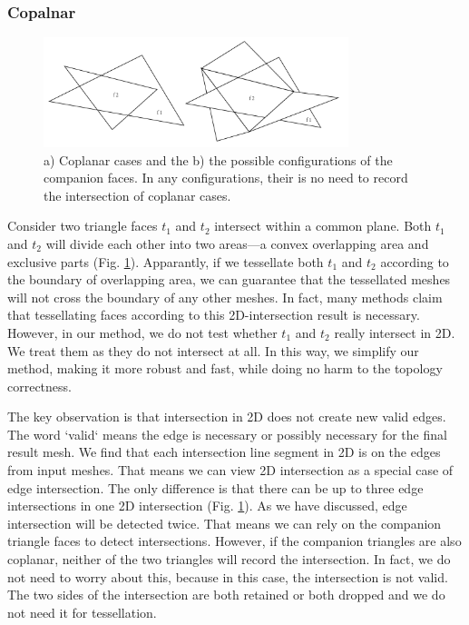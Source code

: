 \documentclass[10pt,journal,compsoc]{IEEEtran}
\begin{document}
\subsubsection{Copalnar}

\begin{figure}[t]
\centering
\includegraphics[width=3.5in]{coplanar}
\caption{a) Coplanar cases and the b) the possible configurations of the companion faces. In any configurations, their is no need to record the intersection of coplanar cases.}
\label{fig:coplanar}
\end{figure}

Consider two triangle faces $t_1$ and $t_2$ intersect within a common plane. Both $t_1$ and $t_2$ will divide each other into two areas---a convex overlapping area and exclusive parts (Fig. \ref{fig:coplanar}). Apparantly, if we tessellate both $t_1$ and $t_2$ according to the boundary of overlapping area, we can guarantee that the tessellated meshes will not cross the boundary of any other meshes. In fact, many methods \cite{feito2013fast,zhou2016mesh} claim that tessellating faces according to this 2D-intersection result is necessary. However, in our method, we do not test whether $t_1$ and $t_2$ really intersect in 2D. We treat them as they do not intersect at all. In this way, we simplify our method, making it more robust and fast, while doing no harm to the topology correctness.

The key observation is that intersection in 2D does not create new valid edges. The word `valid` means the edge is necessary or possibly necessary for the final result mesh. We find that each intersection line segment in 2D is on the edges from input meshes. That means we can view 2D intersection as a special case of edge intersection. The only difference is that there can be up to three edge intersections in one 2D intersection (Fig. \ref{fig:coplanar}). As we have discussed, edge intersection will be detected twice. That means we can rely on the companion triangle faces to detect intersections. However, if the companion triangles are also coplanar, neither of the two triangles will record the intersection. In fact, we do not need to worry about this, because in this case, the intersection is not valid. The two sides of the intersection are both retained or both dropped and we do not need it for tessellation.
\end{document}
